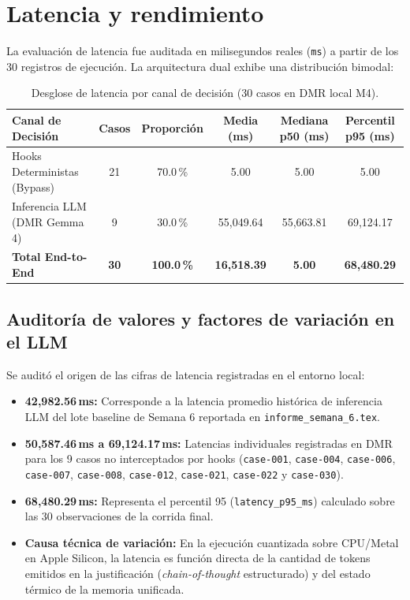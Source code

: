 \documentclass[11pt,a4paper]{article}
\begin{document}
\section{Latencia y rendimiento}
La evaluación de latencia fue auditada en milisegundos reales (\texttt{ms}) a partir de los 30 registros de ejecución. La arquitectura dual exhibe una distribución bimodal:

\begin{table}[H]
\centering
\caption{Desglose de latencia por canal de decisión (30 casos en DMR local M4).}
\label{tab:latencias}
\begin{tabular}{lccccc}
\toprule
\textbf{Canal de Decisión} & \textbf{Casos} & \textbf{Proporción} & \textbf{Media (ms)} & \textbf{Mediana p50 (ms)} & \textbf{Percentil p95 (ms)} \\
\midrule
Hooks Deterministas (Bypass) & 21 & 70.0\,\% & 5.00 & 5.00 & 5.00 \\
Inferencia LLM (DMR Gemma 4) & 9 & 30.0\,\% & 55,049.64 & 55,663.81 & 69,124.17 \\
\midrule
\textbf{Total End-to-End} & \textbf{30} & \textbf{100.0\,\%} & \textbf{16,518.39} & \textbf{5.00} & \textbf{68,480.29} \\
\bottomrule
\end{tabular}
\end{table}

\subsection{Auditoría de valores y factores de variación en el LLM}
Se auditó el origen de las cifras de latencia registradas en el entorno local:
\begin{itemize}[leftmargin=*]
    \item \textbf{42,982.56\,ms:} Corresponde a la latencia promedio histórica de inferencia LLM del lote baseline de Semana 6 reportada en \texttt{informe\_semana\_6.tex}.
    \item \textbf{50,587.46\,ms a 69,124.17\,ms:} Latencias individuales registradas en DMR para los 9 casos no interceptados por hooks (\texttt{case-001}, \texttt{case-004}, \texttt{case-006}, \texttt{case-007}, \texttt{case-008}, \texttt{case-012}, \texttt{case-021}, \texttt{case-022} y \texttt{case-030}).
    \item \textbf{68,480.29\,ms:} Representa el percentil 95 (\texttt{latency\_p95\_ms}) calculado sobre las 30 observaciones de la corrida final.
    \item \textbf{Causa técnica de variación:} En la ejecución cuantizada sobre CPU/Metal en Apple Silicon, la latencia es función directa de la cantidad de tokens emitidos en la justificación (\textit{chain-of-thought} estructurado) y del estado térmico de la memoria unificada.
\end{itemize}
\end{document}

